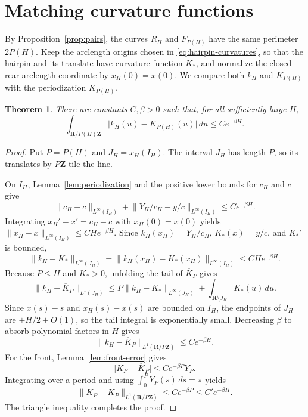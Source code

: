 \documentclass[11pt]{article}
\numberwithin{equation}{section}
\newtheorem{theorem}{Theorem}[section]
\newcommand{\R}{\mathbf{R}}
\newcommand{\Z}{\mathbf{Z}}
\newcommand{\abs}[1]{\lvert #1\rvert}
\newcommand{\norm}[1]{\lVert #1\rVert}
\begin{document}
\section{Matching curvature functions}\label{sec:matching}

By Proposition~\ref{prop:pairs}, the curves \(R_H\) and \(F_{P(H)}\) have
the same perimeter \(2P(H)\). Keep the arclength origins chosen in
\eqref{eq:hairpin-curvatures}, so that the hairpin and its translate
have curvature function \(K_*\), and normalize the closed rear arclength
coordinate by \(x_H(0)=x(0)\). We compare both \(k_H\) and \(K_{P(H)}\) with
the periodization \(\overline K_{P(H)}\).

\begin{theorem}\label{thm:matching}
There are constants \(C,\beta>0\) such that, for all sufficiently large
\(H\),
\[
  \int_{\R/P(H)\Z}\abs{k_H(u)-K_{P(H)}(u)}\,du
  \leq Ce^{-\beta H}.
\]
\end{theorem}

\begin{proof}
Put \(P=P(H)\) and \(J_H=x_H(I_H)\). The interval \(J_H\) has length \(P\),
so its translates by \(P\Z\) tile the line.

On \(I_H\), Lemma~\ref{lem:periodization} and the positive lower bounds for
\(c_H\) and \(c\) give
\[
  \norm{c_H-c}_{L^\infty(I_H)}
  +\norm{Y_H/c_H-y/c}_{L^\infty(I_H)}
  \leq Ce^{-\beta H}.
\]
Integrating \(x_H'-x'=c_H-c\) with \(x_H(0)=x(0)\) yields
\(\norm{x_H-x}_{L^\infty(I_H)}\leq CHe^{-\beta H}\). Since
\(k_H(x_H)=Y_H/c_H\), \(K_*(x)=y/c\), and \(K_*'\) is bounded,
\[
  \norm{k_H-K_*}_{L^\infty(J_H)}
  =\norm{k_H(x_H)-K_*(x_H)}_{L^\infty(I_H)}
  \leq CHe^{-\beta H}.
\]
Because \(P\leq H\) and \(K_*>0\), unfolding the tail of \(\overline K_P\) gives
\[
  \norm{k_H-\overline K_P}_{L^1(J_H)}
  \leq P\norm{k_H-K_*}_{L^\infty(J_H)}
       +\int_{\R\setminus J_H}K_*(u)\,du.
\]
Since \(x(s)-s\) and \(x_H(s)-x(s)\) are bounded on \(I_H\), the endpoints
of \(J_H\) are \(\pm H/2+O(1)\), so the tail integral is exponentially
small. Decreasing \(\beta\) to absorb polynomial factors in \(H\) gives
\[
  \norm{k_H-\overline K_P}_{L^1(\R/P\Z)}\leq Ce^{-\beta H}.
\]
For the front, Lemma~\ref{lem:front-error} gives
\[
  \abs{K_P-\overline K_P}\leq Ce^{-\beta P}Y_P.
\]
Integrating over a period and using \(\int_0^P Y_P(s)\,ds=\pi\) yields
\[
  \norm{K_P-\overline K_P}_{L^1(\R/P\Z)}
  \leq Ce^{-\beta P}\leq C'e^{-\beta H}.
\]
The triangle inequality completes the proof.
\end{proof}
\end{document}
